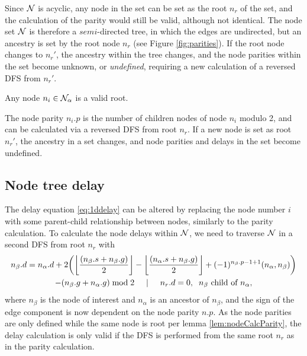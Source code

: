 Since $\mathcal{N}$ is acyclic, any node in the set can be set as the root $n_r$ of the set, and the calculation of the parity would still be valid, although not identical. The node set $\mathcal{N}$ is therefore a $semi$-directed tree, in which the edges are undirected, but an ancestry is set by the root node $n_r$ (see Figure \ref{fig:parities}). If the root node changes to $n_{r}'$, the ancestry within the tree changes, and the node parities within the set become unknown, or \emph{undefined}, requiring a new calculation of a reversed DFS from $n_{r}'$.

\begin{lemma}\label{lem:anynoderoot}
  Any node $n_i \in \mathcal{N}_\alpha$ is a valid root.
\end{lemma}

\begin{lemma}\label{lem:nodeCalcParity}
  The node parity $n_i.p$ is the number of children nodes of node $n_i$ modulo 2, and can be calculated via a reversed DFS from root $n_r$. If a new node is set as root $n_r'$, the ancestry in a set changes, and node parities and delays in the set become undefined.
\end{lemma}

\subsection{Node tree delay}

The delay equation \eqref{eq:1ddelay} can be altered by replacing the node number $i$ with some parent-child relationship between nodes, similarly to the parity calculation. To calculate the node delays within $\mathcal{N}$, we need to traverse $\mathcal{N}$ in a second DFS from root $n_r$ with
\begin{multline}\label{eq:2ddelay}
  n_\beta.d = n_\alpha.d + 2\bigg({\left \lfloor \frac{(n_\beta.s+n_\beta.g)}{2} \right \rfloor } - {\left \lfloor \frac{(n_\alpha.s+n_\beta.g)}{2} \right \rfloor } + (-1)^{n_\beta.p-1+1}(n_\alpha,n_\beta)\bigg) \\
         - (n_\beta.g + n_\alpha.g)\bmod 2 \hspace{.5cm} | \hspace{.5cm} n_r.d = 0, \hspace{.2cm} n_\beta \mbox{ child of } n_\alpha,
\end{multline}
where $n_\beta$ is the node of interest and $n_\alpha$ is an ancestor of $n_\beta$, and the sign of the edge component is now dependent on the node parity $n.p$. As the node parities are only defined while the same node is root per lemma \ref{lem:nodeCalcParity}, the delay calculation is only valid if the DFS is performed from the same root $n_r$ as in the parity calculation.

